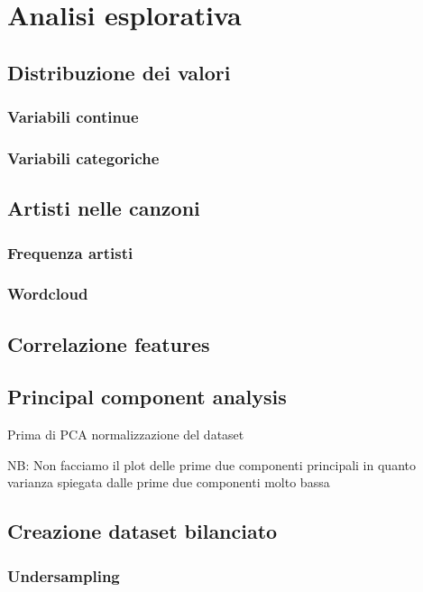 \section{Analisi esplorativa}

\subsection{Distribuzione dei valori}
\subsubsection{Variabili continue}
\subsubsection{Variabili categoriche}

\subsection{Artisti nelle canzoni}
\subsubsection{Frequenza artisti}
\subsubsection{Wordcloud}


\subsection{Correlazione features}

\subsection{Principal component analysis}
Prima di PCA normalizzazione del dataset

NB: Non facciamo il plot delle prime due componenti principali in quanto varianza spiegata dalle prime due componenti molto bassa

\subsection{Creazione dataset bilanciato}
\subsubsection{Undersampling}


